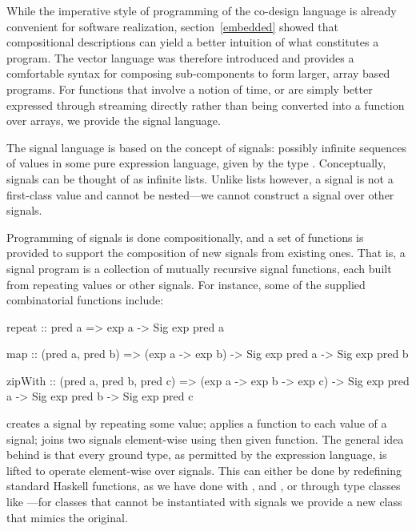 \documentclass[../paper.tex]{subfiles}
\begin{document}
\label{signals}

While the imperative style of programming of the co-design language is already convenient for software realization, section~\ref{embedded} showed that compositional descriptions can yield a better intuition of what constitutes a program. The vector language was therefore introduced and provides a comfortable syntax for composing sub-components to form larger, array based programs. For functions that involve a notion of time, or are simply better expressed through streaming directly rather than being converted into a function over arrays, we provide the signal language.


The signal language is based on the concept of signals: possibly infinite sequences of values in some pure expression language, given by the type . Conceptually, signals can be thought of as infinite lists. Unlike lists however, a signal is not a first-class value and cannot be nested---we cannot construct a signal over other signals.

Programming of signals is done compositionally, and a set of functions is provided to support the composition of new signals from existing ones. That is, a signal program is a collection of mutually recursive signal functions, each built from repeating values or other signals. For instance, some of the supplied combinatorial functions include:

\begin{code}
repeat :: pred a => exp a -> Sig exp pred a

map :: (pred a, pred b) => (exp a -> exp b)
  -> Sig exp pred a -> Sig exp pred b

zipWith :: (pred a, pred b, pred c) => (exp a -> exp b -> exp c)
  -> Sig exp pred a -> Sig exp pred b -> Sig exp pred c
\end{code}

\noindent {} creates a signal by repeating some value;  applies a function to each value of a signal;  joins two signals element-wise using then given function. The general idea behind is that every ground type, as permitted by the expression language, is lifted to operate element-wise over signals. This can either be done by redefining standard Haskell functions, as we have done with ,  and , or through type classes like ---for classes that cannot be instantiated with signals we provide a new class that mimics the original.
\end{document}
